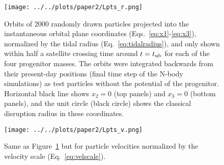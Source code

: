 \documentclass[letterpaper,12pt,preprint]{aastex}
\newcommand{\tub}{t_{\rm ub}}
\begin{document}
\begin{figure}[h]
\begin{center}
\texttt{[image: ../../plots/paper2/Lpts\_r.png]}
\caption{ Orbits of 2000 randomly drawn particles projected into the instantaneous orbital plane coordinates (Eqs.~\ref{eq:x1}-\ref{eq:x3}), normalized by the tidal radius (Eq.~\ref{eq:tidalradius}), and only shown within half a satellite crossing time around $t=\tub$ for each of the four progenitor masses. The orbits were integrated backwards from their present-day positions (final time step of the N-body simulations) as test particles without the potential of the progenitor. Horizontal black line shows $x_2=0$ (top panels) and $x_3=0$ (bottom panels), and the unit circle (black circle) shows the classical disruption radius in these coordinates. }\label{fig:lpts_r}
\end{center}
\end{figure}

\begin{figure}[h]
\begin{center}
\texttt{[image: ../../plots/paper2/Lpts\_v.png]}
\caption{ Same as Figure~\ref{fig:lpts_r} but for particle velocities normalized by the velocity scale (Eq.~\ref{eq:velscale}). }\label{fig:lpts_v}
\end{center}
\end{figure}

\end{document}
